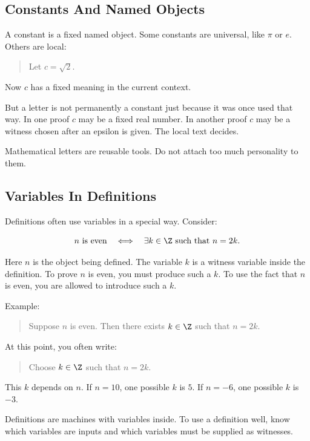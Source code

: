 \subsection{Constants And Named Objects}

A constant is a fixed named object. Some constants are universal, like $\pi$ or $e$. Others are local:

\begin{quote}
Let $c=\sqrt2$.
\end{quote}

Now $c$ has a fixed meaning in the current context.

But a letter is not permanently a constant just because it was once used that way. In one proof $c$ may be a fixed real number. In another proof $c$ may be a witness chosen after an epsilon is given. The local text decides.

Mathematical letters are reusable tools. Do not attach too much personality to them.

\subsection{Variables In Definitions}

Definitions often use variables in a special way. Consider:

\[
n\text{ is even}\quad\Longleftrightarrow\quad \exists k\in\Z\text{ such that }n=2k.
\]

Here $n$ is the object being defined. The variable $k$ is a witness variable inside the definition. To prove $n$ is even, you must produce such a $k$. To use the fact that $n$ is even, you are allowed to introduce such a $k$.

Example:

\begin{quote}
Suppose $n$ is even. Then there exists $k\in\Z$ such that $n=2k$.
\end{quote}

At this point, you often write:

\begin{quote}
Choose $k\in\Z$ such that $n=2k$.
\end{quote}

This $k$ depends on $n$. If $n=10$, one possible $k$ is $5$. If $n=-6$, one possible $k$ is $-3$.

\begin{focusbox}
Definitions are machines with variables inside. To use a definition well, know which variables are inputs and which variables must be supplied as witnesses.
\end{focusbox}

